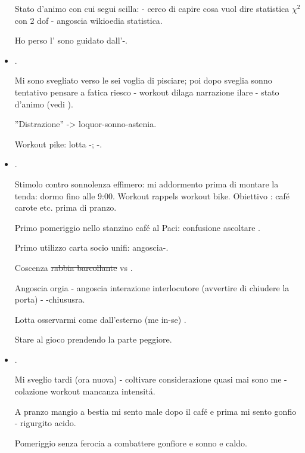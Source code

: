 \begin{itemize}
Stato d'animo con cui segui scilla:  - cerco di capire cosa vuol dire statistica $\chi^2$ con 2 dof - angoscia wikioedia statistica.

Ho perso l' sono guidato dall'-.

\item {}.

Mi sono svegliato verso le sei voglia di pisciare; poi dopo sveglia sonno tentativo pensare a fatica riesco - workout dilaga narrazione ilare - stato d'animo  (vedi ).

''Distrazione'' -> loquor-sonno-astenia.

Workout pike: lotta -; -.

\item {}.

Stimolo contro sonnolenza effimero: mi addormento prima di montare la tenda: dormo fino alle 9:00. Workout rappels workout bike. Obiettivo : caf\'e carote etc. prima di pranzo.

Primo pomeriggio nello stanzino caf\'e al Paci: confusione ascoltare .

Primo utilizzo carta socio unifi: angoscia-.

Coscenza \sout{rabbia barcollante} vs .

Angoscia orgia - angoscia interazione interlocutore (avvertire di chiudere la porta) - -chiususra.

Lotta osservarmi come dall'esterno (me in-se) .

Stare al gioco prendendo la parte peggiore.

\item {}.

Mi sveglio tardi (ora nuova) - coltivare considerazione quasi mai sono me - colazione workout  mancanza intensit\'a.

A pranzo mangio a bestia mi sento male dopo il caf\'e e prima mi sento gonfio - rigurgito acido.

Pomeriggio senza ferocia a combattere gonfiore e sonno e caldo.


\end{itemize}
